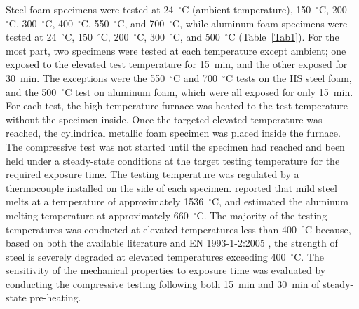 \documentclass[review]{elsarticle}
\begin{document}
Steel foam specimens were tested at 24~$^\circ\mathrm{C}$ (ambient temperature), 150~$^\circ\mathrm{C}$, 200~$^\circ\mathrm{C}$, 300~$^\circ\mathrm{C}$, 400~$^\circ\mathrm{C}$, 550~$^\circ\mathrm{C}$, and 700~$^\circ\mathrm{C}$, while aluminum foam specimens were tested at 24~$^\circ\mathrm{C}$, 150~$^\circ\mathrm{C}$, 200~$^\circ\mathrm{C}$, 300~$^\circ\mathrm{C}$, and 500~$^\circ\mathrm{C}$ (Table~\ref{Tab1}). For the most part, two specimens were tested at each temperature except ambient; one exposed to the elevated test temperature for 15~min, and the other exposed for 30~min. The exceptions were the 550~$^\circ\mathrm{C}$ and 700~$^\circ\mathrm{C}$ tests on the HS steel foam, and the 500~$^\circ\mathrm{C}$ test on aluminum foam, which were all exposed for only 15~min. For each test, the high-temperature furnace was heated to the test temperature without the specimen inside. Once the targeted elevated temperature was reached, the cylindrical metallic foam specimen was placed inside the furnace. The compressive test was not started until the specimen had reached and been held under a steady-state conditions at the target testing temperature for the required exposure time. The testing temperature was regulated by a thermocouple installed on the side of each specimen. \cite{Avalloneetal2007} reported that mild steel melts at a temperature of approximately 1536~$^\circ\mathrm{C}$, and \cite{Ashsby2000} estimated the aluminum melting temperature at approximately 660~$^\circ\mathrm{C}$. The majority of the testing temperatures was conducted at elevated temperatures less than 400~$^\circ\mathrm{C}$ because, based on both the available literature and EN 1993-1-2:2005 \cite{EC3-1-2}, the strength of steel is severely degraded at elevated temperatures exceeding 400~$^\circ\mathrm{C}$. The sensitivity of the mechanical properties to exposure time was evaluated by conducting the compressive testing following both 15~min and 30~min of steady-state pre-heating.
\end{document}
